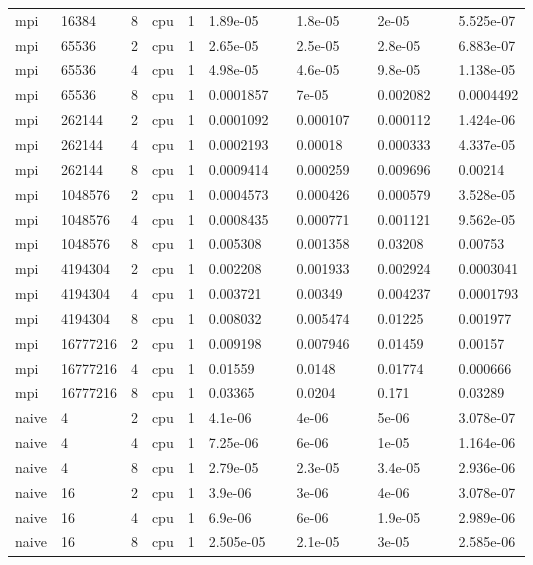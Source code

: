 \begin{tabular}{llllllllllll}
mpi & 16384 & 8 & cpu & 1 & 1.89e-05 &  & 1.8e-05 &  & 2e-05 &  & 5.525e-07 \\
mpi & 65536 & 2 & cpu & 1 & 2.65e-05 &  & 2.5e-05 &  & 2.8e-05 &  & 6.883e-07 \\
mpi & 65536 & 4 & cpu & 1 & 4.98e-05 &  & 4.6e-05 &  & 9.8e-05 &  & 1.138e-05 \\
mpi & 65536 & 8 & cpu & 1 & 0.0001857 &  & 7e-05 &  & 0.002082 &  & 0.0004492 \\
mpi & 262144 & 2 & cpu & 1 & 0.0001092 &  & 0.000107 &  & 0.000112 &  & 1.424e-06 \\
mpi & 262144 & 4 & cpu & 1 & 0.0002193 &  & 0.00018 &  & 0.000333 &  & 4.337e-05 \\
mpi & 262144 & 8 & cpu & 1 & 0.0009414 &  & 0.000259 &  & 0.009696 &  & 0.00214 \\
mpi & 1048576 & 2 & cpu & 1 & 0.0004573 &  & 0.000426 &  & 0.000579 &  & 3.528e-05 \\
mpi & 1048576 & 4 & cpu & 1 & 0.0008435 &  & 0.000771 &  & 0.001121 &  & 9.562e-05 \\
mpi & 1048576 & 8 & cpu & 1 & 0.005308 &  & 0.001358 &  & 0.03208 &  & 0.00753 \\
mpi & 4194304 & 2 & cpu & 1 & 0.002208 &  & 0.001933 &  & 0.002924 &  & 0.0003041 \\
mpi & 4194304 & 4 & cpu & 1 & 0.003721 &  & 0.00349 &  & 0.004237 &  & 0.0001793 \\
mpi & 4194304 & 8 & cpu & 1 & 0.008032 &  & 0.005474 &  & 0.01225 &  & 0.001977 \\
mpi & 16777216 & 2 & cpu & 1 & 0.009198 &  & 0.007946 &  & 0.01459 &  & 0.00157 \\
mpi & 16777216 & 4 & cpu & 1 & 0.01559 &  & 0.0148 &  & 0.01774 &  & 0.000666 \\
mpi & 16777216 & 8 & cpu & 1 & 0.03365 &  & 0.0204 &  & 0.171 &  & 0.03289 \\
naive & 4 & 2 & cpu & 1 & 4.1e-06 &  & 4e-06 &  & 5e-06 &  & 3.078e-07 \\
naive & 4 & 4 & cpu & 1 & 7.25e-06 &  & 6e-06 &  & 1e-05 &  & 1.164e-06 \\
naive & 4 & 8 & cpu & 1 & 2.79e-05 &  & 2.3e-05 &  & 3.4e-05 &  & 2.936e-06 \\
naive & 16 & 2 & cpu & 1 & 3.9e-06 &  & 3e-06 &  & 4e-06 &  & 3.078e-07 \\
naive & 16 & 4 & cpu & 1 & 6.9e-06 &  & 6e-06 &  & 1.9e-05 &  & 2.989e-06 \\
naive & 16 & 8 & cpu & 1 & 2.505e-05 &  & 2.1e-05 &  & 3e-05 &  & 2.585e-06 \\

\end{tabular}
